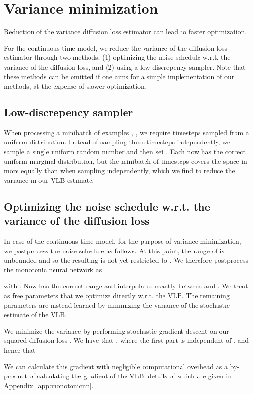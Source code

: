 \documentclass{article}
\begin{document}
\section{Variance minimization}
\label{app:variance_minimization}

Reduction of the variance diffusion loss estimator can lead to faster optimization. 

For the continuous-time model, we reduce the variance of the diffusion loss estimator through two methods: (1) optimizing the noise schedule w.r.t. the variance of the diffusion loss, and (2) using a low-discrepency sampler. Note that these methods can be omitted if one aims for a simple implementation of our methods, at the expense of slower optimization.

\subsection{Low-discrepency sampler}
\label{sec:lowdisc}
When processing a minibatch of  examples , , we require  timesteps  sampled from a uniform distribution. Instead of sampling these timesteps independently, we sample a single uniform random number  and then set . Each  now has the correct uniform marginal distribution, but the minibatch of timesteps covers the space in  more equally than when sampling independently, which we find to reduce the variance in our VLB estimate.

\subsection{Optimizing the noise schedule w.r.t. the variance of the diffusion loss}
In case of the continuous-time model, for the purpose of variance minimization, we postprocess the noise schedule as follows. At this point, the range of  is unbounded and so the resulting  is not yet restricted to . We therefore postprocess the monotonic neural network as

with . Now  has the correct range and interpolates exactly between  and . We treat  as free parameters that we optimize directly w.r.t. the VLB. The remaining parameters  are instead learned by minimizing the variance of the stochastic estimate of the VLB.

We minimize the variance by performing stochastic gradient descent on our squared diffusion loss . We have that , where the first part is independent of , and hence that

We can calculate this gradient with negligible computational overhead as a by-product of calculating the gradient of the VLB, details of which are given in Appendix~\ref{app:monotonicnn}.
\end{document}
